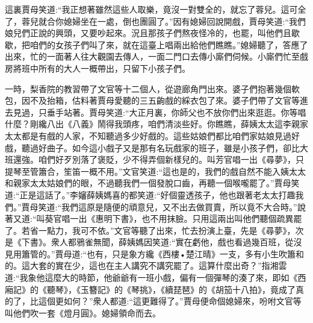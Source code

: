 \begin{parag}
    這裏賈母笑道:“我正想著雖然這些人取樂，竟沒一對雙全的，就忘了蓉兒。這可全了，蓉兒就合你媳婦坐在一處，倒也團圓了。”因有媳婦回說開戲，賈母笑道:“我們娘兒們正說的興頭，又要吵起來。況且那孩子們熬夜怪冷的，也罷，叫他們且歇歇，把咱們的女孩子們叫了來，就在這臺上唱兩出給他們瞧瞧。”媳婦聽了，答應了出來，忙的一面著人往大觀園去傳人，一面二門口去傳小廝們伺候。小廝們忙至戲房將班中所有的大人一概帶出，只留下小孩子們。
\end{parag}


\begin{parag}
    一時，梨香院的教習帶了文官等十二個人，從遊廊角門出來。婆子們抱著幾個軟包，因不及抬箱，估料著賈母愛聽的三五齣戲的綵衣包了來。婆子們帶了文官等進去見過，只垂手站著。賈母笑道:“大正月裏，你師父也不放你們出來逛逛。你等唱什麼？剛纔八出《八義》鬧得我頭疼，咱們清淡些好。你瞧瞧，薛姨太太這李親家太太都是有戲的人家，不知聽過多少好戲的。這些姑娘們都比咱們家姑娘見過好戲，聽過好曲子。如今這小戲子又是那有名玩戲家的班子，雖是小孩子們，卻比大班還強。咱們好歹別落了褒貶，少不得弄個新樣兒的。叫芳官唱一出《尋夢》，只提琴至管簫合，笙笛一概不用。”文官笑道:“這也是的，我們的戲自然不能入姨太太和親家太太姑娘們的眼，不過聽我們一個發脫口齒，再聽一個喉嚨罷了。”賈母笑道:“正是這話了。”李嬸薛姨媽喜的都笑道:“好個靈透孩子，他也跟著老太太打趣我們。”賈母笑道:“我們這原是隨便的頑意兒，又不出去做買賣，所以竟不大合時。”說著又道:“叫葵官唱一出《惠明下書》，也不用抹臉。只用這兩出叫他們聽個疏異罷了。若省一點力，我可不依。”文官等聽了出來，忙去扮演上臺，先是《尋夢》，次是《下書》。衆人都鴉雀無聞，薛姨媽因笑道:“實在虧他，戲也看過幾百班，從沒見用簫管的。”賈母道:“也有，只是象方纔《西樓•楚江晴》一支，多有小生吹簫和的。這大套的實在少，這也在主人講究不講究罷了。這算什麼出奇？”指湘雲道:“我象他這麼大的時節，他爺爺有一班小戲，偏有一個彈琴的湊了來，即如《西廂記》的《聽琴》，《玉簪記》的《琴挑》，《續琵琶》的《胡笳十八拍》，竟成了真的了，比這個更如何？”衆人都道:“這更難得了。”賈母便命個媳婦來，吩咐文官等叫他們吹一套《燈月圓》。媳婦領命而去。
\end{parag}


